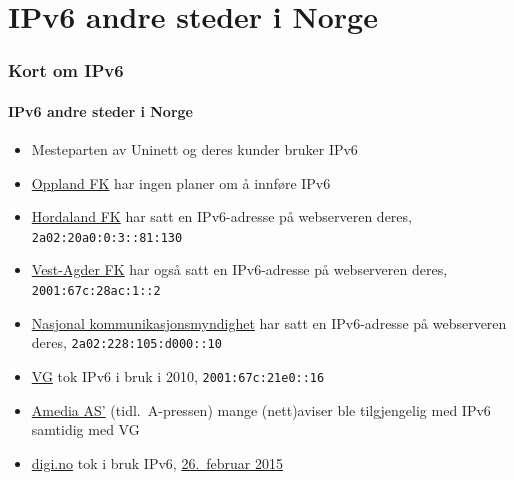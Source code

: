 \section{IPv6 andre steder i Norge}
\begin{frame}%
  \frametitle{Kort om IPv6}
  \framesubtitle{IPv6 andre steder i Norge}
  \pause
  \begin{itemize}[<+->]
  \item Mesteparten av Uninett og deres kunder bruker IPv6
  \item \href{http://www.oppland.no/}{Oppland FK} har ingen
    planer om å innføre IPv6
  \item \href{http://www.hordaland.no/}{Hordaland FK} har satt en
    IPv6-adresse på webserveren deres, \texttt{2a02:20a0:0:3::81:130}
  \item \href{http://www.vaf.no/}{Vest-Agder FK} har også satt en
    IPv6-adresse på webserveren deres, \texttt{2001:67c:28ac:1::2}
  \item \href{http://www.nkom.no/}{Nasjonal kommunikasjonsmyndighet}
    har satt en IPv6-adresse på webserveren deres,
    \texttt{2a02:228:105:d000::10}
  \item \href{http://vg.no/}{VG} tok IPv6 i bruk i 2010,
    \texttt{2001:67c:21e0::16}
  \item \href{http://www.amedia.no/}{Amedia AS'} (tidl.\ A-pressen) mange
    (nett)aviser ble tilgjengelig med IPv6 samtidig med VG
  \item \href{http://www.digi.no/}{digi.no} tok i bruk IPv6,
    \href{https://twitter.com/digi_no/status/567348983237206016}{26.~februar
      2015}
  \end{itemize}
\end{frame}

